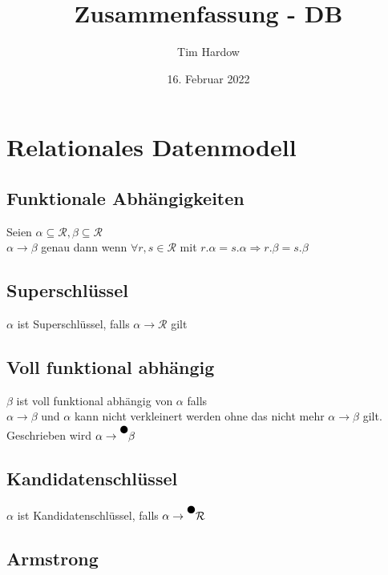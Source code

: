 \documentclass{scrartcl}
\title{Zusammenfassung - DB}
\author{Tim Hardow}
\date{16. Februar 2022}
\begin{document}
\maketitle

\section{Relationales Datenmodell}
\subsection{Funktionale Abhängigkeiten}
Seien $\alpha \subseteq \mathcal{R}, \beta \subseteq \mathcal{R}$\\
$\alpha \to \beta$ genau dann wenn $\forall r, s \in \mathcal{R}$ mit $r.\alpha = s.\alpha \Rightarrow r.\beta = s.\beta$
\subsection{Superschlüssel}
$\alpha$ ist Superschlüssel, falls $\alpha \to \mathcal{R}$ gilt
\subsection{Voll funktional abhängig}
$\beta$ ist voll funktional abhängig von $\alpha$ falls\\
$\alpha \to \beta$
und $\alpha$ kann nicht verkleinert werden ohne das nicht mehr $\alpha \to \beta$ gilt.\\
Geschrieben wird $\alpha \to \overset{\newmoon}{{\color{white}a}} \beta$
\subsection{Kandidatenschlüssel}
$\alpha$ ist Kandidatenschlüssel, falls $\alpha \to \overset{\newmoon}{{\color{white}a}} \mathcal{R}$
\subsection{Armstrong}
\end{document}
